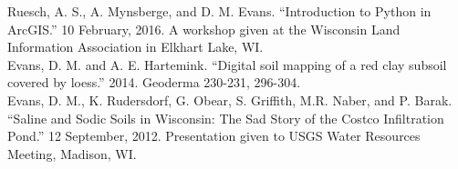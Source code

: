 \documentclass{article}
\begin{document}
\begin{small}
\leftskip 0.1in
\parindent -0.1in
Ruesch, A. S., A. Mynsberge, and D. M. Evans. ``Introduction to Python in ArcGIS.'' 10 February, 2016. A workshop given at the Wisconsin Land Information Association in Elkhart Lake, WI.\\

Evans, D. M. and A. E. Hartemink. ``Digital soil mapping of a red clay subsoil covered by loess.'' 2014. Geoderma 230-231, 296-304.\\

Evans, D. M., K. Rudersdorf, G. Obear, S. Griffith, M.R. Naber, and P. Barak. ``Saline and Sodic Soils in Wisconsin: The Sad Story of the Costco Infiltration Pond.'' 12 September, 2012. Presentation given to USGS Water Resources Meeting, Madison, WI.\\


\end{small}
\end{document}
